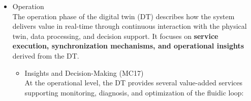 \documentclass[
]{article}
\providecommand{\tightlist}{%
  \setlength{\itemsep}{0pt}\setlength{\parskip}{0pt}}
\begin{document}
\begin{itemize}
\begin{itemize}
\begin{itemize}
\begin{itemize}
        \begin{itemize}
        \tightlist
        \item
          \textbf{Edge computing layer:}

          \begin{itemize}
          \tightlist
          \item
            Industrial PC for local execution and low-latency
            operations,
          \item
            Kubernetes cluster for containerized services,
          \item
            Real-time interaction with the physical system.
          \end{itemize}
        \item
          \textbf{Cloud computing layer:}

          \begin{itemize}
          \tightlist
          \item
            Azure-based services for scalable data processing,
          \item
            Data Lake for persistent storage,
          \item
            Event-driven computation (Azure Functions),
          \item
            Model management (FMU registry).
          \end{itemize}
        \item
          \textbf{Application layer:}\\
          Web-based interface for visualization, monitoring, and user
          interaction.
        \end{itemize}
      \end{itemize}
    \item
      Operation\\
      The operation phase of the digital twin (DT) describes how the
      system delivers value in real-time through continuous interaction
      with the physical twin, data processing, and decision support. It
      focuses on \textbf{service execution, synchronization mechanisms,
      and operational insights} derived from the DT.

      \begin{itemize}
      \tightlist
      \item
        Insights and Decision-Making (MC17)\\
        At the operational level, the DT provides several value-added
        services supporting monitoring, diagnosis, and optimization of
        the fluidic loop:


\end{itemize}
\end{itemize}
\end{itemize}
\end{itemize}
\end{document}
